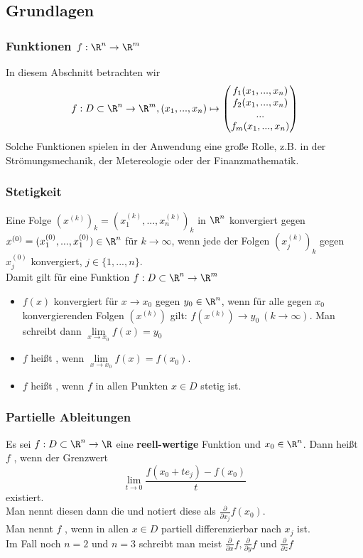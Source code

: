 \subsection{Grundlagen}
%
\begin{frame}\frametitle{Funktionen $f: \R^n \to \R^m$}
In diesem Abschnitt betrachten wir 
$$
f: D \subset \R^n \to \R^m, (x_1,...,x_n) \mapsto \begin{pmatrix}f_1(x_1,...,x_n)\\ f_2(x_1,...,x_n)\\ ...\\f_m(x_1,...,x_n) \end{pmatrix}
$$
\vfill
Solche Funktionen spielen in der Anwendung eine große Rolle, z.B. in der Strömungsmechanik, der Metereologie oder der Finanzmathematik.

\end{frame}
%
%
\begin{frame}\frametitle{Stetigkeit}
Eine Folge $(x^{(k)})_k=(x_1^{(k)},...,x_n^{(k)})_k$ in $\R^n$ konvergiert gegen $x^{(0)}=(x_1^{(0)},...,x_1^{(0)}) \in \R^n$ für $k \to \infty$, wenn jede der Folgen $(x_j^{(k)})_k$ gegen $x_j^{(0)}$ konvergiert, $j \in \{1,...,n\}$. \\\vfill
\pause Damit gilt für eine Funktion $f: D \subset \R^n \to \R^m$\\\vfill
\begin{itemize}
\item $f(x)$ konvergiert für $x \to x_0$ gegen $y_0 \in \R^n$, wenn für alle gegen $x_0$ konvergierenden Folgen $(x^{(k)})$ gilt: $f(x^{(k)}) \to y_0 \ (k \to \infty)$. Man schreibt dann $\lim \limits_{x\to x_0}f(x)=y_0$\\\pause
\item $f$ heißt , wenn $\lim \limits_{x\to x_0} f(x)=f(x_0)$.\\\pause
\item $f$ heißt , wenn $f$ in allen Punkten $x \in D$ stetig ist.
\end{itemize}

\end{frame} 
%
\begin{frame}\frametitle{Partielle Ableitungen}
Es sei $f: D \subset \R^n \to \R$ eine \textbf{reell-wertige} Funktion und $x_0 \in \R^n$. Dann heißt $f$ , wenn der Grenzwert
$$
\lim_{t \to 0} \frac{f(x_0+te_j)-f(x_0)}{t}
$$
existiert.\\\pause Man nennt diesen dann die  und notiert diese als $\frac{\partial}{\partial x_j} f(x_0)$.\\\pause
\vfill
Man nennt $f$ , wenn in allen $x \in D$ partiell differenzierbar nach $x_j$ ist.\\\pause
\vfill
Im Fall noch $n=2$ und $n=3$ schreibt man meist $\frac{\partial}{\partial x} f, \frac{\partial}{\partial y} f$ und $\frac{\partial}{\partial z} f$

\end{frame} 
